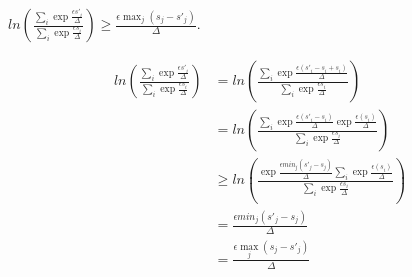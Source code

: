 \begin{lemma}
    \label{priv-inequality}
    $ln\left(\frac{\sum_{i} \exp{\frac{\epsilon s'_i}{\Delta}}}{\sum_{i} \exp{\frac{\epsilon s_i}{\Delta}}}\right) \geq \frac{\epsilon \max_j (s_j - s'_j)}{\Delta}$.
\end{lemma}

\begin{align*}
    ln\left(\frac{\sum_{i} \exp{\frac{\epsilon s'_i}{\Delta}}}{\sum_{i} \exp{\frac{\epsilon s_i}{\Delta}}}\right)
    &= ln\left(\frac{\sum_{i} \exp{\frac{\epsilon (s'_i - s_i + s_i)}{\Delta}}}{\sum_{i} \exp{\frac{\epsilon s_i}{\Delta}}}\right) \\
    &= ln\left(\frac{\sum_{i} \exp{\frac{\epsilon (s'_i - s_i)}{\Delta}}\exp{\frac{\epsilon (s_i)}{\Delta}}}{\sum_{i} \exp{\frac{\epsilon s_i}{\Delta}}}\right) \\
    &\geq ln\left(\frac{\exp{\frac{\epsilon min_j(s'_j - s_j)}{\Delta}} \sum_{i} \exp{\frac{\epsilon (s_i)}{\Delta}}}{\sum_{i} \exp{\frac{\epsilon s_i}{\Delta}}}\right) \\
    &= \frac{\epsilon min_j(s'_j - s_j)}{\Delta} \\
    &= \frac{\epsilon \max_j (s_j - s'_j)}{\Delta}
\end{align*}






